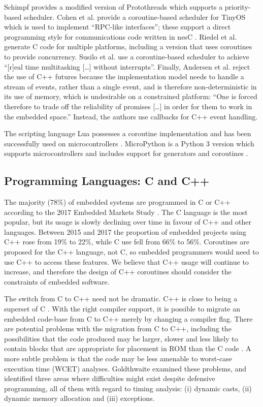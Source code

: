 Schimpf \cite{Schimpf2012b} provides a modified version of Protothreads which supports a priority-based scheduler. Cohen et al. \cite{Cohen2007b} provide a coroutine-based scheduler for TinyOS \cite{Levis2005} which is used to implement “RPC-like interfaces”; these support a direct programming style for communications code written in nesC \cite{Gay2003}. Riedel et al.\cite{Riedel2010} generate C code for multiple platforms, including a version that uses coroutines to provide concurrency. Susilo et al. \cite{Susilo2009} use a coroutine-based scheduler to achieve “[r]eal time multitasking […] without interrupts”. Finally, Andersen et al. \cite{Andersen2017b} reject the use of C++ futures because the implementation model needs to handle a stream of events, rather than a single event, and is therefore non-deterministic in its use of memory, which is undesirable on a constrained platform: “One is forced therefore to trade off the reliability of promises […] in order for them to work in the embedded space.” Instead, the authors use callbacks for C++ event handling.

The scripting language Lua possesses a coroutine implementation \cite{Moura2004a} and has been successfully used on microcontrollers \cite{Hempel2008}. MicroPython \cite{George2014a} is a Python 3 version which supports microcontrollers \cite{George2014b} and includes support for generators and coroutines \cite{VanRossum2005, Python2017}.

\subsection{Programming Languages: C and C++}

The majority (78\%) of embedded systems are programmed in C or C++ according to the 2017 Embedded Markets Study \cite{AspenCore2017}. The C language is the most popular, but its usage is slowly declining over time in favour of C++ and other languages. Between 2015 and 2017 the proportion of embedded projects using C++ rose from 19\% to 22\%, while C use fell from 66\% to 56\%. Coroutines are proposed for the C++ language, not C, so embedded programmers would need to use C++ to access these features. We believe that C++ usage will continue to increase, and therefore the design of C++ coroutines should consider the constraints of embedded software.  

The switch from C to C++ need not be dramatic. C++ is close to being a superset of C \cite{Stroustrup1986}. With the right compiler support, it is possible to migrate an embedded code-base from C to C++ merely by changing a compiler flag. There are potential problems with the migration from C to C++, including the possibilities that the code produced may be larger, slower and less likely to contain blocks that are appropriate for placement in ROM than the C code \cite{Goldthwaite2006, Herity2015}. A more subtle problem is that the code may be less amenable to worst-case execution time (WCET) analyses. Goldthwaite \cite{Goldthwaite2006} examined these problems, and identified three areas where difficulties might exist despite defensive programming, all of them with regard to timing analysis: (i) dynamic casts, (ii) dynamic memory allocation and (iii) exceptions.

